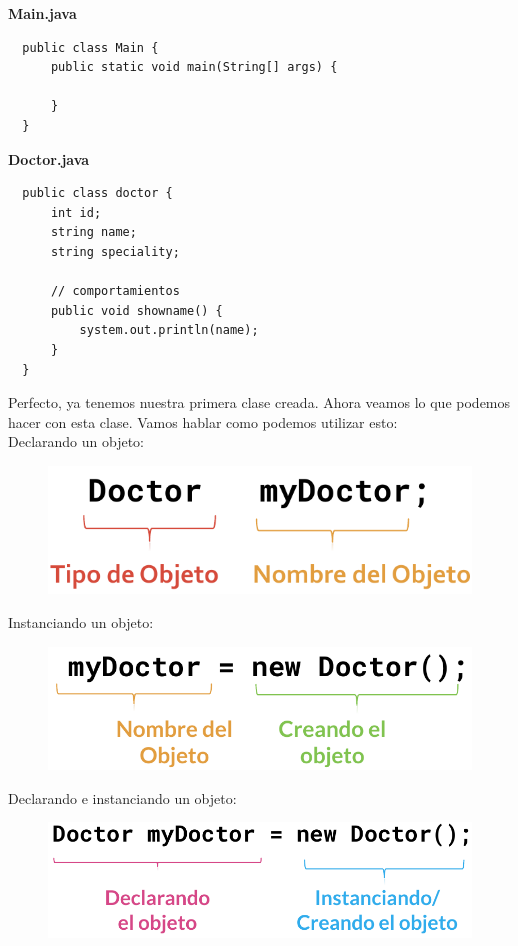 \documentclass{article}
\begin{document}
\textbf{Main.java}
\begin{verbatim}
  public class Main {
      public static void main(String[] args) {

      }
  }
\end{verbatim}

\textbf{Doctor.java}
\begin{verbatim}
  public class doctor {
      int id;
      string name;
      string speciality;

      // comportamientos
      public void showname() {
          system.out.println(name);
      }
  }
\end{verbatim}

Perfecto, ya tenemos nuestra primera clase creada. Ahora veamos lo que podemos
hacer con esta clase. Vamos hablar como podemos utilizar esto:\\

Declarando un objeto:\\
\begin{figure}[h!]
  \centering
  \includegraphics[scale=0.35]{./Pictures/009_declarar_objetos.png}
\end{figure}

Instanciando un objeto:\\
\begin{figure}[h!]
  \centering
  \includegraphics[scale=0.35]{./Pictures/010_instanciar_objetos.png}
\end{figure}

Declarando e instanciando un objeto:
\begin{figure}[h!]
  \centering
  \includegraphics[scale=0.35]{./Pictures/011_dec_instan.png}
\end{figure}
\end{document}
